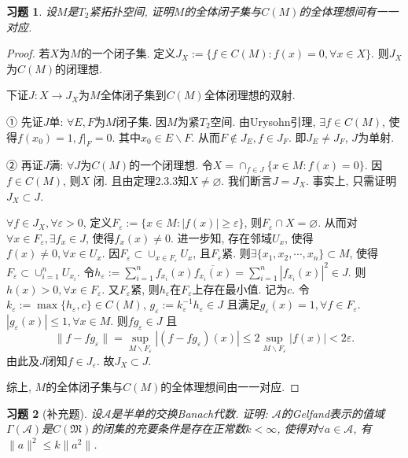 \documentclass[UTF8,twoside]{ctexbook}
\newtheorem{exercise}{习题}[section]
\newcommand{\h}{\mathscr}
\numberwithin{equation}{section}
\begin{document}
	\begin{exercise}
		设$M$是$T_2$紧拓扑空间, 证明$M$的全体闭子集与$C(M)$的全体理想间有一一对应.
	\end{exercise}
	\begin{proof}
		若$X$为$M$的一个闭子集. 定义$J_X:=\{f\in C(M):f(x)=0,\forall x\in X\}$. 则$J_X$为$C(M)$的闭理想.

		下证$J:X\rightarrow J_X$为$M$全体闭子集到$C(M)$全体闭理想的双射.

		① 先证$J$单: $\forall E,F$为$M$闭子集. 因$M$为紧$T_2$空间. 由Urysohn引理, $\exists f\in C(M)$, 使得$f(x_0)=1, f|_F=0$. 其中$x_0\in E\backslash F$. 从而$F\notin J_E,f\in J_F$. 即$J_E\neq J_F$, $J$为单射.

		② 再证$J$满: $\forall J$为$C(M)$的一个闭理想. 令$X=\cap_{f\in J}\{x\in M:f(x)=0\}$. 因$f\in C(M)$, 则$X$ 闭. 且由定理2.3.3知$X\neq\varnothing$. 我们断言$J=J_X$. 事实上, 只需证明$J_X\subset J$.

		$\forall f\in J_X,\forall \varepsilon>0$, 定义$F_\varepsilon:=\{x\in M:|f(x)|\geq \varepsilon\}$, 则$F_\varepsilon\cap X=\varnothing$. 从而对$\forall x\in F_\varepsilon,\exists f_x\in J$, 使得$f_x(x)\neq 0$. 进一步知, 存在邻域$U_x$, 使得$f(x)\neq 0,\forall x\in U_x$. 因$F_\varepsilon\subset \cup_{x\in F_\varepsilon}U_x$, 且$F_\varepsilon$紧. 则$\exists\{x_1,x_2,\cdots,x_n\}\subset M$, 使得$F_\varepsilon\subset \cup_{i=1}^n U_{x_i}$. 令$h_\varepsilon:=\sum_{i=1}^n f_{x_i}(x)\overline{f_{x_i}(x)}=\sum_{i=1}^n|f_{x_i}(x)|^2\in J$. 则$h(x)>0, \forall x\in F_\varepsilon$. 又$F_\varepsilon$紧, 则$h_\varepsilon$在$F_\varepsilon$上存在最小值. 记为$c$. 令$k_\varepsilon:=\max\{h_\varepsilon,c\}\in C(M)$, $g_\varepsilon:=k_\varepsilon^{-1}h_\varepsilon\in J$ 且满足$g_\varepsilon(x)=1,\forall f\in F_\varepsilon$. $|g_\varepsilon(x)|\leq 1,\forall x\in M$. 则$fg_\varepsilon\in J$ 且\[\|f-fg_\varepsilon\|=\sup_{M\backslash F_\varepsilon}|(f-fg_\varepsilon)(x)|\leq 2\sup_{M\backslash F_\varepsilon}|f(x)|<2\varepsilon.\]
		由此及$J$闭知$f\in J_\varepsilon$. 故$J_X\subset J$.

		综上, $M$的全体闭子集与$C(M)$的全体理想间由一一对应.
	\end{proof}
	\begin{exercise}[补充题]
		设$\h A$是半单的交换Banach代数. 证明: $\h A$的Gelfand表示的值域$\Gamma(\h A)$是$C(\mathfrak M)$的闭集的充要条件是存在正常数$k<\infty$, 使得对$\forall a\in \h A$, 有$\|a\|^2\leq k\|a^2\|$.
	\end{exercise}
\end{document}
